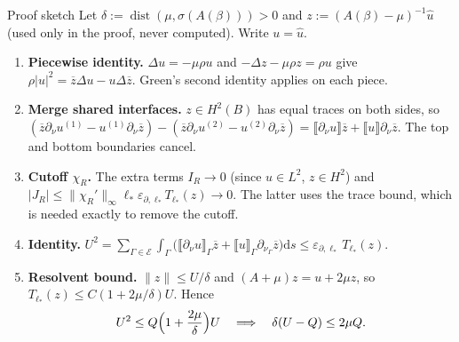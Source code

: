 \documentclass[aspectratio=169]{beamer}
\newcommand{\dd}{\mathrm{d}}
\newcommand{\jump}[1]{\llbracket #1\rrbracket}
\newcommand{\eps}{\varepsilon_{\partial,\ell_*}}
\newcommand{\dist}{\operatorname{dist}}
\begin{document}
\begin{frame}{Proof sketch}
  \footnotesize
  Let $\delta:=\dist(\mu,\sigma(A(\beta)))>0$ and $z:=(A(\beta)-\mu)^{-1}\widehat u$
  (used only in the proof, never computed). Write $u=\widehat u$.
  \begin{enumerate}
    \item \textbf{Piecewise identity.} $\Delta u=-\mu\rho u$ and
      $-\Delta z-\mu\rho z=\rho u$ give $\rho|u|^2=\overline z\Delta u-u\Delta\overline z$.
      Green's second identity applies on each piece.
    \item \textbf{Merge shared interfaces.} $z\in H^2(B)$ has equal traces on both sides,
      so
      $(\overline z\partial_\nu u^{(1)}-u^{(1)}\partial_\nu\overline z)
      -(\overline z\partial_\nu u^{(2)}-u^{(2)}\partial_\nu\overline z)
      =\jump{\partial_\nu u}\overline z+\jump{u}\partial_\nu\overline z$.
      The top and bottom boundaries cancel.
    \item \textbf{Cutoff $\chi_R$.} The extra terms $I_R\to0$ (since $u\in L^2$, $z\in H^2$)
      and $|J_R|\le\lVert\chi_R'\rVert_\infty\ell_*\eps T_{\ell_*}(z)\to0$. The latter uses
      the trace bound, which is needed exactly to remove the cutoff.
    \item \textbf{Identity.}
      $\displaystyle U^2=\sum_{\Gamma\in\mathscr E}\int_\Gamma\bigl(\jump{\partial_\nu u}_\Gamma\overline z
        +\jump{u}_\Gamma\partial_{\nu_\Gamma}\overline z\bigr)\dd s\le\eps\,T_{\ell_*}(z).$
    \item \textbf{Resolvent bound.} $\lVert z\rVert\le U/\delta$ and
      $(A+\mu)z=u+2\mu z$, so $T_{\ell_*}(z)\le C(1+2\mu/\delta)U$. Hence
      \[
        U^2\le Q\Bigl(1+\frac{2\mu}{\delta}\Bigr)U
        \quad\Longrightarrow\quad\delta(U-Q)\le2\mu Q.
      \]
  \end{enumerate}
\end{frame}
\end{document}
